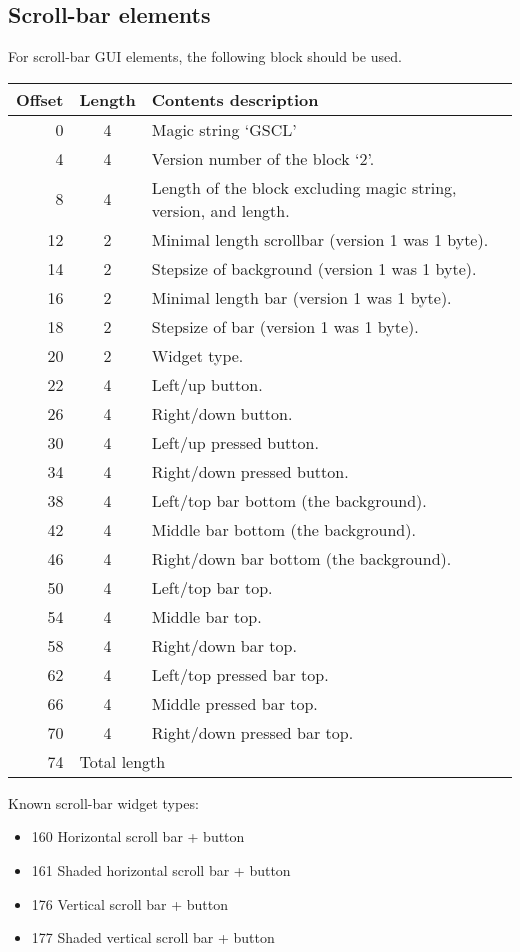 \documentclass{article}
\begin{document}
\subsection{Scroll-bar elements}
For scroll-bar GUI elements, the following block
should be used.
\begin{center}
\begin{tabular}{|r|c|l|} \hline
\textbf{Offset} & \textbf{Length} & \textbf{Contents description} \\ \hline
   0 &  4 & Magic string `GSCL' \\
   4 &  4 & Version number of the block `2'. \\
   8 &  4 & Length of the block excluding magic string, version, and length. \\
  12 &  2 & Minimal length scrollbar (version 1 was 1 byte). \\
  14 &  2 & Stepsize of background (version 1 was 1 byte). \\
  16 &  2 & Minimal length bar (version 1 was 1 byte). \\
  18 &  2 & Stepsize of bar (version 1 was 1 byte). \\
  20 &  2 & Widget type. \\
  22 &  4 & Left/up button. \\
  26 &  4 & Right/down button. \\ \hline
  30 &  4 & Left/up pressed button. \\
  34 &  4 & Right/down pressed button. \\ \hline
  38 &  4 & Left/top bar bottom (the background). \\
  42 &  4 & Middle bar bottom (the background). \\
  46 &  4 & Right/down bar bottom (the background). \\ \hline
  50 &  4 & Left/top bar top. \\
  54 &  4 & Middle bar top. \\
  58 &  4 & Right/down bar top. \\ \hline
  62 &  4 & Left/top pressed bar top. \\
  66 &  4 & Middle pressed bar top. \\
  70 &  4 & Right/down pressed bar top. \\ \hline
  74 & \multicolumn{2}{l|}{Total length} \\ \hline
\end{tabular}
\end{center}

Known scroll-bar widget types:
\begin{itemize}
\item 160 Horizontal scroll bar + button
\item 161 Shaded horizontal scroll bar + button
\item 176 Vertical scroll bar + button
\item 177 Shaded vertical scroll bar + button
\end{itemize}
\end{document}
